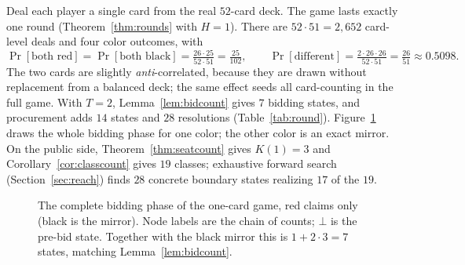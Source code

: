 \documentclass[11pt]{article}
\theoremstyle{plain}
\theoremstyle{definition}
\theoremstyle{remark}
\newcommand{\R}{\ensuremath{\mathsf{R}}}
\begin{document}
Deal each player a single card from the real $52$-card deck. The game lasts
exactly one round (Theorem~\ref{thm:rounds} with $H=1$). There are
$52\cdot 51=2{,}652$ card-level deals and four color outcomes, with
\[
  \Pr[\text{both red}] = \Pr[\text{both black}] = \tfrac{26\cdot 25}{52\cdot 51}
  = \tfrac{25}{102},\qquad
  \Pr[\text{different}] = \tfrac{2\cdot 26\cdot 26}{52\cdot 51} = \tfrac{26}{51}
  \approx 0.5098 .
\]
The two cards are slightly \emph{anti}-correlated, because they are drawn
without replacement from a balanced deck; the same effect seeds all
card-counting in the full game. With $T=2$, Lemma~\ref{lem:bidcount} gives
$7$ bidding states, and procurement adds $14$ states and $28$ resolutions
(Table~\ref{tab:round}). Figure~\ref{fig:h1bid} draws the whole bidding
phase for one color; the other color is an exact mirror. On the public
side, Theorem~\ref{thm:seatcount} gives $K(1)=3$ and
Corollary~\ref{cor:classcount} gives $19$ classes; exhaustive forward
search (Section~\ref{sec:reach}) finds $28$ concrete boundary states
realizing $17$ of the $19$.

\begin{figure}[t]
\centering
{}
\caption{The complete bidding phase of the one-card game, red claims only
(black is the mirror). Node labels are the chain of counts; $\bot$ is the
pre-bid state. Together with the black mirror this is $1+2\cdot 3=7$
states, matching Lemma~\ref{lem:bidcount}.}
\label{fig:h1bid}
\end{figure}
\end{document}
